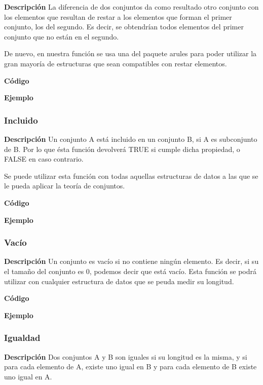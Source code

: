     \textbf{Descripci\'on}
    La diferencia de dos conjuntos da como resultado otro conjunto con los elementos que resultan de 
    restar a los elementos que forman el primer conjunto, los del segundo. Es decir, se obtendr\'ian 
    todos elementos del  primer conjunto que no est\'an en el segundo.

    De nuevo, en nuestra funci\'on se usa una del paquete arules para poder utilizar la gran mayor\'ia de estructuras 
    que sean compatibles con restar elementos.
    

    \textbf{C\'odigo}

    
    \textbf{Ejemplo}


\subsubsection{Incluido}

    \textbf{Descripci\'on}
    Un conjunto A est\'a incluido en un conjunto B, si A es subconjunto de B. Por lo que \'esta funci\'on 
    devolver\'a TRUE si cumple dicha propiedad, o FALSE en caso contrario.

    Se puede utilizar esta funci\'on con todas aquellas estructuras de datos a las que se le pueda aplicar 
    la teor\'ia de conjuntos.

    \textbf{C\'odigo}


    \textbf{Ejemplo}


\subsubsection{Vac\'io}

    \textbf{Descripci\'on}
    Un conjunto es vac\'io si no contiene ning\'un elemento. Es decir, si su el tama\~no del conjunto es 0, 
    podemos decir que est\'a vac\'io. Esta funci\'on se podr\'a utilizar con cualquier estructura de datos 
    que se peuda medir su longitud.

    \textbf{C\'odigo}


    \textbf{Ejemplo}


\subsubsection{Igualdad}

    \textbf{Descripci\'on}
    Dos conjuntos A y B son iguales si su longitud es la misma, y si para cada elemento de A, existe uno igual 
    en B y para cada elemento de B existe uno igual en A.

